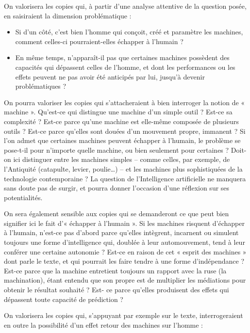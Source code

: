 		{On valorisera les copies qui, à partir d’une analyse attentive de la question
posée, en saisiraient la dimension problématique :

\begin{itemize}
\item Si d’un côté, c’est bien l’homme qui conçoit, créé et paramètre les machines,
comment celles-ci pourraient-elles échapper à l’humain ?
\item En même temps, n’apparaît-il pas que certaines machines possèdent des
capacités qui dépassent celles de l’homme, et dont les performances ou les
effets peuvent ne pas avoir été anticipés par lui, jusqu’à devenir
problématiques ?
\end{itemize}

On pourra valoriser les copies qui s’attacheraient à bien interroger la notion de
« machine ». Qu’est-ce qui distingue une machine d’un simple outil ? Est-ce sa
complexité ? Est-ce parce qu’une machine est elle-même composée de plusieurs
outils ? Est-ce parce qu’elles sont douées d’un mouvement propre, immanent ? Si l’on
admet que certaines machines peuvent échapper à l’humain, le problème se pose-t-il
pour n’importe quelle machine, ou bien seulement pour certaines ? Doit-on ici
distinguer entre les machines simples -- comme celles, par exemple, de l’Antiquité
(catapulte, levier, poulie…) – et les machines plus sophistiquées de la technologie
contemporaine ? La question de l’Intelligence artificielle ne manquera sans doute pas
de surgir, et pourra donner l’occasion d’une réflexion sur ses potentialités.

On sera également sensible aux copies qui se demanderont ce que peut bien
signifier ici le fait d’« échapper à l'humain ». Si les machines risquent d'échapper à
l'humain, n'est-ce pas d'abord parce qu'elles intègrent, incarnent ou simulent toujours
une forme d'intelligence qui, doublée à leur automouvement, tend à leur conférer une
certaine autonomie ? Est-ce en raison de cet « esprit des machines » dont parle le
texte, et qui pourrait les faire tendre à une forme d'indépendance ? Est-ce parce que
la machine entretient toujours un rapport avec la ruse (la machination), étant entendu
que son propre est de multiplier les médiations pour obtenir le résultat souhaité ? Est-
ce parce qu'elles produisent des effets qui dépassent toute capacité de prédiction ?

On valorisera les copies qui, s'appuyant par exemple sur le texte, interrogeraient
en outre la possibilité d'un effet retour des machines sur l'homme :

}
